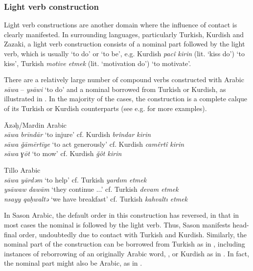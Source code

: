 \documentclass[output=paper]{langsci/langscibook}
\begin{document}
\subsubsection{Light verb construction}

Light verb constructions are another domain where the influence of contact is clearly manifested. In surrounding languages, particularly Turkish, Kurdish and Zazaki, a light verb construction consists of a nominal part followed by the light verb, which is usually `to do' or `to be', e.g. Kurdish \textit{pacî kirin} (lit. `kiss do') `to kiss', Turkish \textit{motive etmek} (lit. `motivation do') `to motivate’. 

There are a relatively large number of compound verbs constructed with Arabic \textit{s\={a}wa} – \textit{ys\={a}wi} `to do' and a nominal borrowed from Turkish or Kurdish, as illustrated in . In the majority of the cases, the construction is a complete calque of its Turkish or Kurdish counterparts (see e.g. \citealt{Versteegh1997,Lahdo2009,Grigore2007article,Talay2007,Jastrow2011anatolian,Akkus2016,Akkus2017,AkkusBenmamoun2018,Bituna2016} for more examples).


\begin{exe}
\ex \label{light}  
		\begin{xlist}
		\ex Āzəḫ/Mardin Arabic \citep[184]{Talay2007}\\ \textit{s\={a}wa brīndār} `to injure'	cf. Kurdish \textit{brîndar kirin}\\
\textit{s\={a}wa \v{g}āmērtīye} `to act generously' cf. Kurdish \textit{camêrtî kirin}\\
\textit{s\={a}wa ɣōt} `to mow' cf. Kurdish  \textit{ğôt kirin}


	\ex \label{com2} Tillo Arabic \citep[202]{Lahdo2009}\\ \textit{s\={a}wa yārdəm} `to help' cf. Turkish \textit{yardım etmek}\\
\textit{ys\={a}waw dawām} `they continue ...' cf.  Turkish \textit{devam etmek}\\
\textit{nsayy qa\d{h}waltə} `we have breakfast' cf. Turkish \textit{kahvalt{\i} etmek}
		\end{xlist}
		
\end{exe}


\noindent In Sason Arabic, the default order in this construction has reversed, in that in most cases the nominal is followed by the light verb. Thus, Sason manifests head-final order, undoubtedly due to contact with Turkish and Kurdish. Similarly, the nominal part of the construction can be borrowed from Turkish as in , including instances of reborrowing of an originally Arabic word, , or Kurdish as in . In fact, the nominal part might also be Arabic, as in . 
\end{document}
